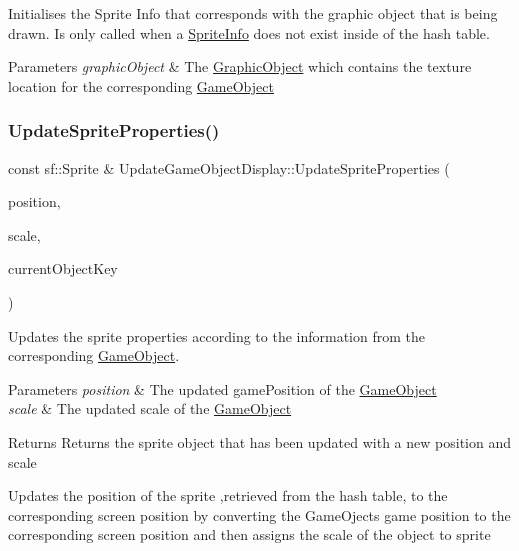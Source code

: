Initialises the Sprite Info that corresponds with the graphic object that is being drawn. Is only called when a \hyperlink{struct_sprite_info}{Sprite\+Info} does not exist inside of the hash table. 


\begin{DoxyParams}{Parameters}
{\em graphic\+Object} & The \hyperlink{class_graphic_object}{Graphic\+Object} which contains the texture location for the corresponding \hyperlink{class_game_object}{Game\+Object} \\
\hline
\end{DoxyParams}
\mbox{\label{class_update_game_object_display_ae0419a504b647db44f909f75efdca9a3}} 
\subsubsection{\texorpdfstring{Update\+Sprite\+Properties()}{UpdateSpriteProperties()}}
{\footnotesize\ttfamily const sf\+::\+Sprite \& Update\+Game\+Object\+Display\+::\+Update\+Sprite\+Properties (\begin{DoxyParamCaption}\item[{const \hyperlink{class_vector2_d}{Vector2D}$<$ double $>$ \&}]{position,  }\item[{const \hyperlink{structxy_vector}{xy\+Vector} \&}]{scale,  }\item[{const string \&}]{current\+Object\+Key }\end{DoxyParamCaption})\hspace{0.3cm}{\ttfamily [private]}}



Updates the sprite properties according to the information from the corresponding \hyperlink{class_game_object}{Game\+Object}. 


\begin{DoxyParams}{Parameters}
{\em position} & The updated game\+Position of the \hyperlink{class_game_object}{Game\+Object} \\
\hline
{\em scale} & The updated scale of the \hyperlink{class_game_object}{Game\+Object} \\
\hline
\end{DoxyParams}
\begin{DoxyReturn}{Returns}
Returns the sprite object that has been updated with a new position and scale
\end{DoxyReturn}
Updates the position of the sprite ,retrieved from the hash table, to the corresponding screen position by converting the Game\+Oject\textquotesingle{}s game position to the corresponding screen position and then assigns the scale of the object to sprite 


